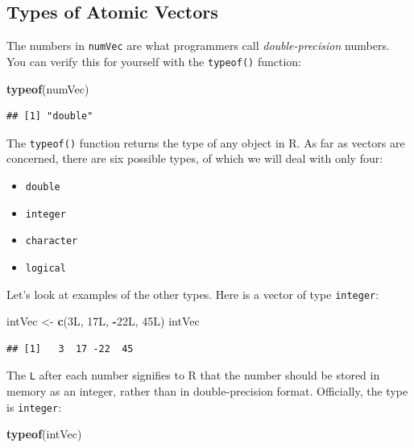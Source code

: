 \documentclass[]{book}
\makeatletter
\newenvironment{Shaded}{\begin{snugshade}}{\end{snugshade}}
\newcommand{\KeywordTok}[1]{\textcolor[rgb]{0.13,0.29,0.53}{\textbf{#1}}}
\newcommand{\StringTok}[1]{\textcolor[rgb]{0.31,0.60,0.02}{#1}}
\newcommand{\OperatorTok}[1]{\textcolor[rgb]{0.81,0.36,0.00}{\textbf{#1}}}
\newcommand{\NormalTok}[1]{#1}
\providecommand{\tightlist}{%
  \setlength{\itemsep}{0pt}\setlength{\parskip}{0pt}}
\newenvironment{kframe}{%
\medskip{}
\setlength{\fboxsep}{.8em}
 \def\at@end@of@kframe{}%
 \ifinner\ifhmode%
  \def\at@end@of@kframe{\end{minipage}}%
  \begin{minipage}{\columnwidth}%
 \fi\fi%
 \def\FrameCommand##1{\hskip\@totalleftmargin \hskip-\fboxsep
 \colorbox{shadecolor}{##1}\hskip-\fboxsep
     \hskip-\linewidth \hskip-\@totalleftmargin \hskip\columnwidth}%
 \MakeFramed {\advance\hsize-\width
   \@totalleftmargin\z@ \linewidth\hsize
   \@setminipage}}%
 {\par\unskip\endMakeFramed%
 \at@end@of@kframe}
\renewenvironment{Shaded}{\begin{kframe}}{\end{kframe}}
\theoremstyle{definition}
\theoremstyle{definition}
\theoremstyle{definition}
\theoremstyle{remark}
\makeatother
\begin{document}
\subsection{Types of Atomic Vectors}\label{types-of-atomic-vectors}

The numbers in \texttt{numVec} are what programmers call
\emph{double-precision} numbers. You can verify this for yourself with
the \texttt{typeof()}
function:

\begin{Shaded}
\begin{Highlighting}[]
\KeywordTok{typeof}\NormalTok{(numVec)}
\end{Highlighting}
\end{Shaded}

\begin{verbatim}
## [1] "double"
\end{verbatim}

The \texttt{typeof()} function returns the type of any object in R. As
far as vectors are concerned, there are six possible types, of which we
will deal with only four:

\begin{itemize}
\tightlist
\item
  \texttt{double}
\item
  \texttt{integer}
\item
  \texttt{character}
\item
  \texttt{logical}
\end{itemize}

Let's look at examples of the other types. Here is a vector of type
\texttt{integer}:

\begin{Shaded}
\begin{Highlighting}[]
\NormalTok{intVec <-}\StringTok{ }\KeywordTok{c}\NormalTok{(3L, 17L, }\OperatorTok{-}\NormalTok{22L, 45L)}
\NormalTok{intVec}
\end{Highlighting}
\end{Shaded}

\begin{verbatim}
## [1]   3  17 -22  45
\end{verbatim}

The \texttt{L} after each number signifies to R that the number should
be stored in memory as an integer, rather than in double-precision
format. Officially, the type is \texttt{integer}:

\begin{Shaded}
\begin{Highlighting}[]
\KeywordTok{typeof}\NormalTok{(intVec)}
\end{Highlighting}
\end{Shaded}
\end{document}
